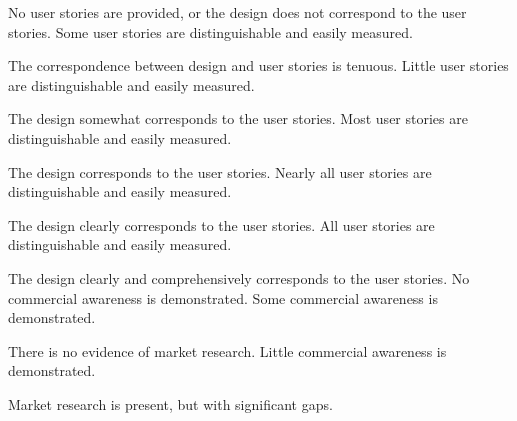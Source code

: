 \documentclass{../fal_assignment}
\begin{document}
\rubricyeartwo

\begin{markingrubric}
%
        \grade\fail No user stories are provided, or the design does not correspond to the user stories.
        \grade Some user stories are distinguishable and easily measured.
            \par The correspondence between design and user stories is tenuous.
        \grade Little user stories are distinguishable and easily measured.
            \par The design somewhat corresponds to the user stories.
        \grade Most user stories are distinguishable and easily measured.
            \par The design corresponds to the user stories.
        \grade Nearly all user stories are distinguishable and easily measured.
            \par The design clearly corresponds to the user stories.
        \grade All user stories are distinguishable and easily measured.
            \par The design clearly and comprehensively corresponds to the user stories.
%
        \grade\fail No commercial awareness is demonstrated.
        \grade Some commercial awareness is demonstrated.
            \par There is no evidence of market research.
        \grade Little commercial awareness is demonstrated.
            \par Market research is present, but with significant gaps.

\end{markingrubric}
\end{document}
